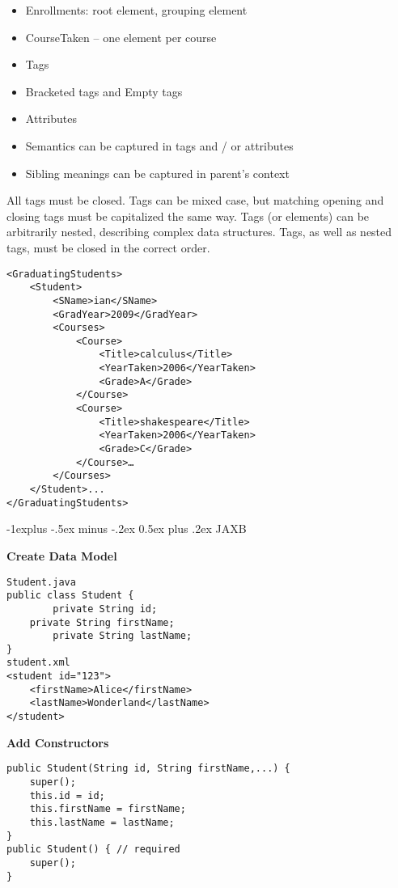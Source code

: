 \documentclass[10pt,landscape]{article}
\makeatletter
\renewcommand{\subsection}{\@startsection{subsection}{2}{0mm}%
                                {-1explus -.5ex minus -.2ex}%
                                {0.5ex plus .2ex}%
                                {\normalfont\normalsize\bfseries}}
\makeatother
\begin{document}
\begin{multicols}{3}
\begin{itemize}
    \item Enrollments: root element, grouping element
    \item CourseTaken – one element per course
    \item Tags
    \item Bracketed tags and Empty tags
    \item Attributes
    \item Semantics can be captured in tags and / or attributes
    \item Sibling meanings can be captured in parent's context
\end{itemize}
All tags must be closed.
Tags can be mixed case, but matching opening and closing tags must be capitalized the same way.
Tags (or elements) can be arbitrarily nested, describing complex data structures.
Tags, as well as nested tags, must be closed in the correct order.
\begin{lstlisting}
<GraduatingStudents>
	<Student>
		<SName>ian</SName>
		<GradYear>2009</GradYear>
		<Courses>
			<Course>
				<Title>calculus</Title>
				<YearTaken>2006</YearTaken>
				<Grade>A</Grade>
			</Course>
			<Course>
				<Title>shakespeare</Title>
				<YearTaken>2006</YearTaken>
				<Grade>C</Grade>
			</Course>…
		</Courses>
	</Student>...
</GraduatingStudents>
\end{lstlisting}




\subsection{JAXB}

\textbf{Create Data Model}

\begin{lstlisting}
Student.java
public class Student {
		private String id;
	private String firstName;
		private String lastName;
}
student.xml
<student id="123">
    <firstName>Alice</firstName>
    <lastName>Wonderland</lastName>
</student>
\end{lstlisting}

\textbf{Add Constructors}
\begin{lstlisting}
public Student(String id, String firstName,...) {
	super();
	this.id = id;
	this.firstName = firstName;
	this.lastName = lastName;
}
public Student() { // required
	super();
}
\end{lstlisting}


\end{multicols}
\end{document}
